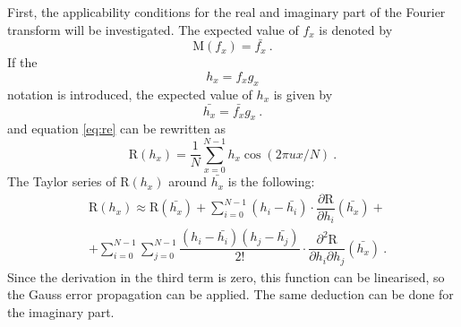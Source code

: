 \documentclass[a4paper,12pt,oneside]{article}
\newcommand{\R}{\mathrm{R}}
\begin{document}
First, the applicability conditions for the real and imaginary part of the Fourier transform will be investigated. The expected value of $f_x$ is denoted by
$$ \mathrm{M}(f_x) = \bar{f_x} \ .$$
If the
$$ h_x = f_x g_x $$
notation is introduced, the expected value of $h_x$ is given by
$$ \bar{h_x} = \bar{f_x}g_x \ .$$
and equation \eqref{eq:re} can be rewritten as
\begin{equation}\label{eq:re2}
  \R(h_x) = \frac{1}{N} \sum\limits_{x=0}^{N-1} h_x \cos(2\pi ux/N) \ .
\end{equation}
The Taylor series of $\R(h_x)$ around $\bar{h_x}$ is the following:
\begin{eqnarray}
  & \R(h_x) \approx \R(\bar{h_x}) + 
  \sum\limits_{i=0}^{N-1} (h_i - \bar{h_i}) \cdot \dfrac{\partial \R}{\partial h_i}(\bar{h_x}) + \nonumber\\
  & + \sum\limits_{i=0}^{N-1}\sum\limits_{j=0}^{N-1} \dfrac{(h_i - \bar{h_i})(h_j - \bar{h_j})}{2!} \cdot
  \dfrac{\partial^2 \R}{\partial h_i \partial h_j}(\bar{h_x}) \ .
\end{eqnarray}
Since the derivation in the third term is zero, this function can be linearised, so the Gauss error propagation can be applied. The same deduction can be done for the imaginary part.
\end{document}
